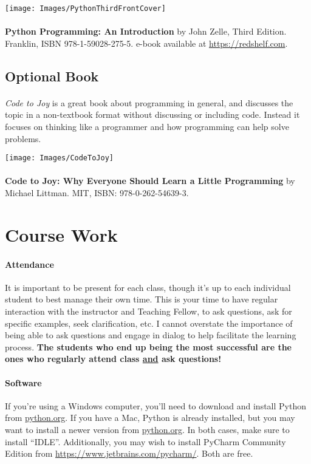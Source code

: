 \documentclass[letter,10pt]{article}
\begin{document}
\texttt{[image: Images/PythonThirdFrontCover]}

\paragraph{}\textbf{Python Programming: An Introduction} by John Zelle, Third Edition. Franklin, ISBN 978-1-59028-275-5. e-book available at \url{https://redshelf.com}.

\subsection*{Optional Book}
\paragraph{}\textit{Code to Joy} is a great book about programming in general, and discusses the topic in a non-textbook format without discussing or including code. Instead it focuses on thinking like a programmer and how programming can help solve problems.

\texttt{[image: Images/CodeToJoy]}

\paragraph{}\textbf{Code to Joy: Why Everyone Should Learn a Little Programming} by Michael Littman. MIT, ISBN: 978-0-262-54639-3.

\section*{Course Work}\label{sec:coursework}
\paragraph{Attendance}It is important to be present for each class, though it's up to each individual student to best manage their own time. This is your time to have regular interaction with the instructor and Teaching Fellow, to ask questions, ask for specific examples, seek clarification, etc. I cannot overstate the importance of being able to ask questions and engage in dialog to help facilitate the learning process. \textbf{The students who end up being the most successful are the ones who regularly attend class \underline{and} ask questions!}

\paragraph{Software}If you're using a Windows computer, you'll need to download and install Python from \href{https://www.python.org/downloads/windows/}{python.org}. If you have a Mac, Python is already installed, but you may want to install a newer version from \href{https://www.python.org/downloads/macos/}{python.org}. In both cases, make sure to install ``IDLE''. Additionally, you may wish to install PyCharm Community Edition from \url{https://www.jetbrains.com/pycharm/}. Both are free.
\end{document}
